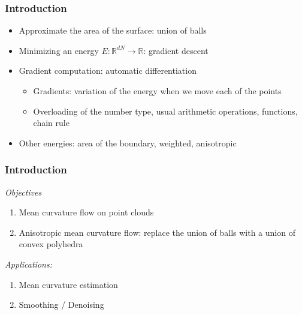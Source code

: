 \documentclass{beamer}
\newcommand{\R}{\mathbb{R}}
\begin{document}
\begin{frame}
    \frametitle{Introduction}

    \begin{itemize}
        \item Approximate the area of the surface: union of balls
        \item Minimizing an energy $ E : \R^{dN} \to \R $: gradient descent
        \item Gradient computation: automatic differentiation
            \begin{itemize}
                \item Gradients: variation of the energy when we move each of
                    the points
                \item Overloading of the number type, usual arithmetic
                    operations, functions, chain rule
            \end{itemize}
        \item Other energies: area of the boundary, weighted, anisotropic
    \end{itemize}
\end{frame}

\begin{frame}
    \frametitle{Introduction}

    \emph{Objectives}
    \begin{enumerate}
        \item Mean curvature flow on point clouds
        \item Anisotropic mean curvature flow: replace the union of balls with a
            union of convex polyhedra
    \end{enumerate}

    \emph{Applications:}
    \begin{enumerate}
        \item Mean curvature estimation
        \item Smoothing / Denoising
    \end{enumerate}
\end{frame}


\end{document}
